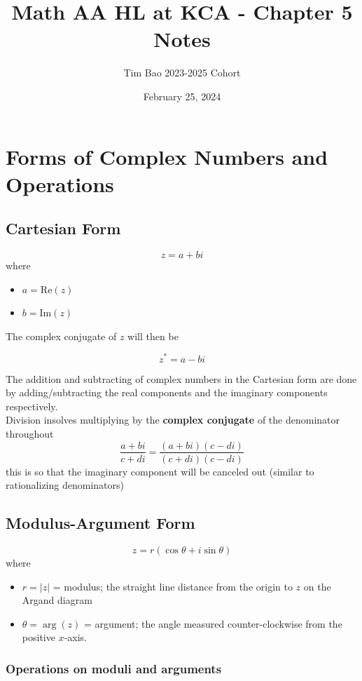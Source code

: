 \documentclass[11pt]{article}
\title{Math AA HL at KCA - Chapter 5 Notes}
\author{Tim Bao 2023-2025 Cohort}
\date{February 25, 2024}
\newcommand{\lb}{\\[8pt]}
\begin{document}
\maketitle
\pagebreak
\tableofcontents
\pagebreak

\section{Forms of Complex Numbers and Operations}

\subsection{Cartesian Form}

$$z = a + bi$$
where
\begin{itemize}
  \item $a = \text{Re}{(z)}$
  \item $b = \text{Im}{(z)}$
\end{itemize}

\noindent The complex conjugate of $z$ will then be

$$z^* = a - bi$$

\noindent The addition and subtracting of complex numbers in the Cartesian form are done by adding/subtracting the real components and the imaginary components respectively.\lb
Division insolves multiplying by the \textbf{complex conjugate} of the denominator throughout
$$\frac{a + bi}{c + di} = \frac{(a + bi)(c - di)}{(c + di)(c - di)}$$ this is so that the imaginary component will be canceled out (similar to rationalizing denominators)

\pagebreak

\subsection{Modulus-Argument Form}

$$z = r\left(\cos\theta + i\sin\theta\right)$$
where
\begin{itemize}
  \item $r = |z|$ = modulus; the straight line distance from the origin to $z$ on the Argand diagram
  \item $\theta = \arg(z)$ = argument; the angle measured counter-clockwise from the positive $x$-axis.
\end{itemize}

\subsubsection*{Operations on moduli and arguments}
\end{document}
